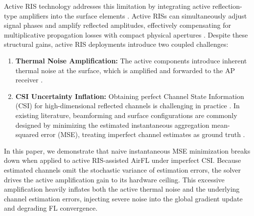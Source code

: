 \documentclass[journal,twocolumn]{IEEEtran}
\begin{document}
Active RIS technology addresses this limitation by integrating active reflection-type amplifiers into the surface elements \cite{ruizhe_long_83e9453a, zhiyuan_yu_9b3d9a51}. Active RISs can simultaneously adjust signal phases and amplify reflected amplitudes, effectively compensating for multiplicative propagation losses with compact physical apertures \cite{zijian_zhang_9030ef0d}. Despite these structural gains, active RIS deployments introduce two coupled challenges:
\begin{enumerate}
    \item \textbf{Thermal Noise Amplification:} The active components introduce inherent thermal noise at the surface, which is amplified and forwarded to the AP receiver \cite{ruizhe_long_83e9453a, jin_ho_yang_7e8f89d2}.
    \item \textbf{CSI Uncertainty Inflation:} Obtaining perfect Channel State Information (CSI) for high-dimensional reflected channels is challenging in practice \cite{hao_zhou_d3ae4bac, jiacheng_yao_0a2deb55}. In existing literature, beamforming and surface configurations are commonly designed by minimizing the estimated instantaneous aggregation mean-squared error (MSE), treating imperfect channel estimates as ground truth \cite{jingheng_zheng_80cd7b06, anish_pradhan_defb987b}.
\end{enumerate}

In this paper, we demonstrate that naive instantaneous MSE minimization breaks down when applied to active RIS-assisted AirFL under imperfect CSI. Because estimated channels omit the stochastic variance of estimation errors, the solver drives the active amplification gain to its hardware ceiling. This excessive amplification heavily inflates both the active thermal noise and the underlying channel estimation errors, injecting severe noise into the global gradient update and degrading FL convergence.
\end{document}

